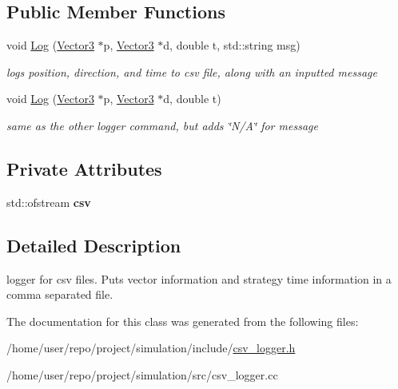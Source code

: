 \subsection*{Public Member Functions}
\begin{DoxyCompactItemize}
\item 
\mbox{\label{classCSVLogger_a6f6f8cce2294cf48ebfcee86d5afd365}} 
void \hyperlink{classCSVLogger_a6f6f8cce2294cf48ebfcee86d5afd365}{Log} (\hyperlink{classVector3}{Vector3} $\ast$p, \hyperlink{classVector3}{Vector3} $\ast$d, double t, std\+::string msg)
\begin{DoxyCompactList}\small\item\em logs position, direction, and time to csv file, along with an inputted message \end{DoxyCompactList}\item 
\mbox{\label{classCSVLogger_ae59e4258b85bfb18452c6e37d4623257}} 
void \hyperlink{classCSVLogger_ae59e4258b85bfb18452c6e37d4623257}{Log} (\hyperlink{classVector3}{Vector3} $\ast$p, \hyperlink{classVector3}{Vector3} $\ast$d, double t)
\begin{DoxyCompactList}\small\item\em same as the other logger command, but adds \char`\"{}\+N/\+A\char`\"{} for message \end{DoxyCompactList}\end{DoxyCompactItemize}
\subsection*{Private Attributes}
\begin{DoxyCompactItemize}
\item 
\mbox{\label{classCSVLogger_a088a4194c2d461ca1e9561fd4283471b}} 
std\+::ofstream {\bfseries csv}
\end{DoxyCompactItemize}


\subsection{Detailed Description}
logger for csv files. Puts vector information and strategy time information in a comma separated file. 

The documentation for this class was generated from the following files\+:\begin{DoxyCompactItemize}
\item 
/home/user/repo/project/simulation/include/\hyperlink{csv__logger_8h}{csv\+\_\+logger.\+h}\item 
/home/user/repo/project/simulation/src/csv\+\_\+logger.\+cc\end{DoxyCompactItemize}
